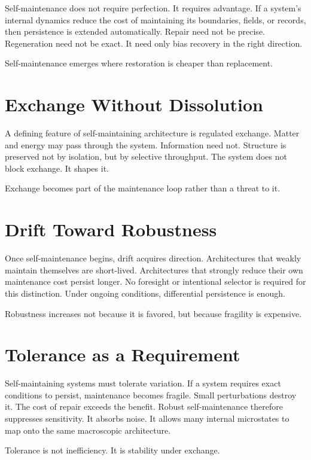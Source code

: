 \documentclass[11pt,twoside,openright]{book}
\begin{document}
Self-maintenance does not require perfection. It requires advantage. If a system's internal dynamics reduce the cost of maintaining its boundaries, fields, or records, then persistence is extended automatically. Repair need not be precise. Regeneration need not be exact. It need only bias recovery in the right direction.

Self-maintenance emerges where restoration is cheaper than replacement.

\section*{Exchange Without Dissolution}

A defining feature of self-maintaining architecture is regulated exchange. Matter and energy may pass through the system. Information need not. Structure is preserved not by isolation, but by selective throughput. The system does not block exchange. It shapes it.

Exchange becomes part of the maintenance loop rather than a threat to it.

\section*{Drift Toward Robustness}

Once self-maintenance begins, drift acquires direction. Architectures that weakly maintain themselves are short-lived. Architectures that strongly reduce their own maintenance cost persist longer. No foresight or intentional selector is required for this distinction. Under ongoing conditions, differential persistence is enough.

Robustness increases not because it is favored, but because fragility is expensive.

\section*{Tolerance as a Requirement}

Self-maintaining systems must tolerate variation. If a system requires exact conditions to persist, maintenance becomes fragile. Small perturbations destroy it. The cost of repair exceeds the benefit. Robust self-maintenance therefore suppresses sensitivity. It absorbs noise. It allows many internal microstates to map onto the same macroscopic architecture.

Tolerance is not inefficiency. It is stability under exchange.
\end{document}
